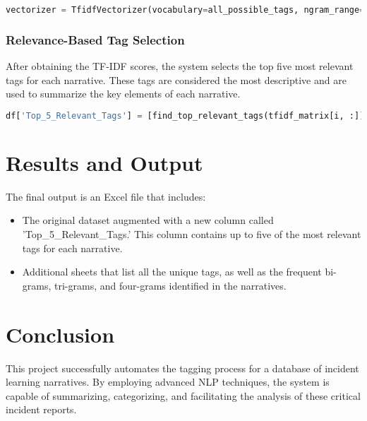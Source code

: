 \documentclass[12pt]{article}
\begin{document}
\begin{lstlisting}[language=Python]
vectorizer = TfidfVectorizer(vocabulary=all_possible_tags, ngram_range=(1, 4))
\end{lstlisting}

\subsubsection{Relevance-Based Tag Selection}
After obtaining the TF-IDF scores, the system selects the top five most relevant tags for each narrative. These tags are considered the most descriptive and are used to summarize the key elements of each narrative.

\begin{lstlisting}[language=Python]
df['Top_5_Relevant_Tags'] = [find_top_relevant_tags(tfidf_matrix[i, :]) for i in range(tfidf_matrix.shape[0])]
\end{lstlisting}

\section{Results and Output}
The final output is an Excel file that includes:

\begin{itemize}
    \item The original dataset augmented with a new column called 'Top_5_Relevant_Tags.' This column contains up to five of the most relevant tags for each narrative.
    \item Additional sheets that list all the unique tags, as well as the frequent bi-grams, tri-grams, and four-grams identified in the narratives.
\end{itemize}

\section{Conclusion}
This project successfully automates the tagging process for a database of incident learning narratives. By employing advanced NLP techniques, the system is capable of summarizing, categorizing, and facilitating the analysis of these critical incident reports.
\end{document}
